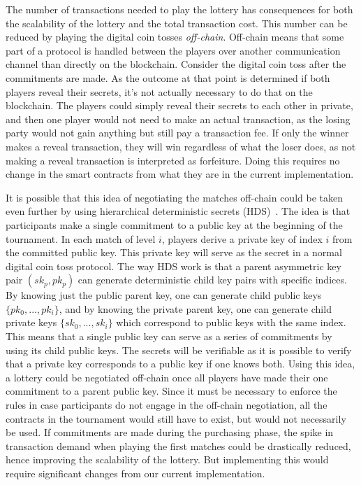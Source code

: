 The number of transactions needed to play the lottery has consequences for both the scalability of the lottery and the total transaction cost. This number can be reduced by playing the digital coin tosses \emph{off-chain}. Off-chain means that some part of a protocol is handled between the players over another communication channel than directly on the blockchain. Consider the digital coin toss after the commitments are made. As the outcome at that point is determined if both players reveal their secrets, it's not actually necessary to do that on the blockchain. The players could simply reveal their secrets to each other in private, and then one player would not need to make an actual transaction, as the losing party would not gain anything but still pay a transaction fee. If only the winner makes a reveal transaction, they will win regardless of what the loser does, as not making a reveal transaction is interpreted as forfeiture. Doing this requires no change in the smart contracts from what they are in the current implementation.

It is possible that this idea of negotiating the matches off-chain could be taken even further by using hierarchical deterministic secrets (HDS)~\cite{wuille_bitcoin_2012}. The idea is that participants make a single commitment to a public key at the beginning of the tournament. In each match of level $i$, players derive a private key of index $i$ from the committed public key. This private key will serve as the secret in a normal digital coin toss protocol. The way HDS work is that a parent asymmetric key pair $(sk_p, pk_p)$ can generate deterministic child key pairs with specific indices. By knowing just the public parent key, one can generate child public keys $\{pk_0, ..., pk_i\}$, and by knowing the private parent key, one can generate child private keys $\{sk_0, ..., sk_i\}$ which correspond to public keys with the same index. This means that a single public key can serve as a series of commitments by using its child public keys. The secrets will be verifiable as it is possible to verify that a private key corresponds to a public key if one knows both. Using this idea, a lottery could be negotiated off-chain once all players have made their one commitment to a parent public key. Since it must be necessary to enforce the rules in case participants do not engage in the off-chain negotiation, all the contracts in the tournament would still have to exist, but would not necessarily be used. If commitments are made during the purchasing phase, the spike in transaction demand when playing the first matches could be drastically reduced, hence improving the scalability of the lottery. But implementing this would require significant changes from our current implementation.

